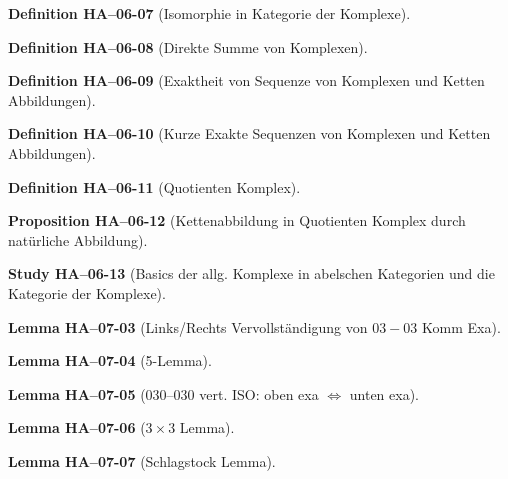 \documentclass[10pt, letterpaper]{article}
\newcommand{\CustomHeading}[3]{%
  \par\medskip\noindent%
  \textbf{#1 #2} \textnormal{(#3)}.\enskip%
}
\newenvironment{DEF}[2]{\CustomHeading{Definition}{#1}{#2}}{}
\newenvironment{PROP}[2]{\CustomHeading{Proposition}{#1}{#2}}{}
\newenvironment{LEM}[2]{\CustomHeading{Lemma}{#1}{#2}}{}
\newenvironment{STUD}[2]{\CustomHeading{Study}{#1}{#2}}{}
\begin{document}
\begin{DEF}{HA--06-07}{Isomorphie in Kategorie der Komplexe}
\end{DEF}

\begin{DEF}{HA--06-08}{Direkte Summe von Komplexen}
\end{DEF}

\begin{DEF}{HA--06-09}{Exaktheit von Sequenze von Komplexen und Ketten Abbildungen}
\end{DEF}

\begin{DEF}{HA--06-10}{Kurze Exakte Sequenzen von Komplexen und Ketten Abbildungen}
\end{DEF}

\begin{DEF}{HA--06-11}{Quotienten Komplex}
\end{DEF}

\begin{PROP}{HA--06-12}{Kettenabbildung in Quotienten Komplex durch natürliche Abbildung}
\end{PROP}

\begin{STUD}{HA--06-13}{Basics der allg. Komplexe in abelschen Kategorien und die Kategorie der Komplexe}
\end{STUD}

\begin{LEM}{HA--07-03}{Links/Rechts Vervollständigung von $03-03$ Komm Exa}
\end{LEM}

\begin{LEM}{HA--07-04}{5-Lemma}
\end{LEM}

\begin{LEM}{HA--07-05}{$030$–$030$ vert. ISO: oben exa $\Leftrightarrow$ unten exa}
\end{LEM}

\begin{LEM}{HA--07-06}{$3\times 3$ Lemma}
\end{LEM}

\begin{LEM}{HA--07-07}{Schlagstock Lemma}
\end{LEM}
\end{document}
